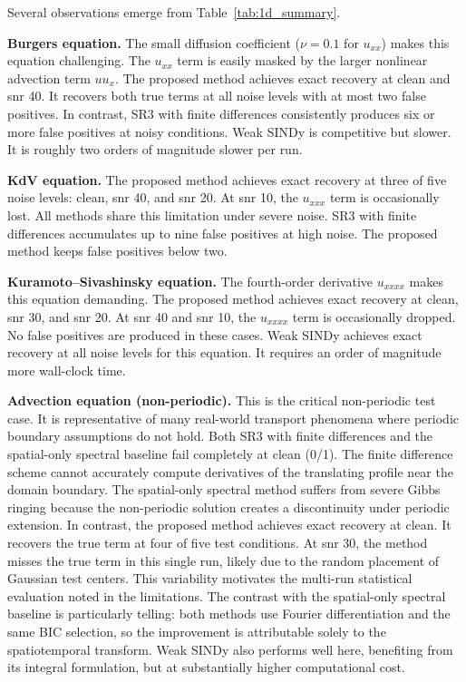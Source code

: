 \documentclass[preprint,12pt]{elsarticle}
\begin{document}
Several observations emerge from Table~\ref{tab:1d_summary}.

\textbf{Burgers equation.} The small diffusion coefficient ($\nu=0.1$ for $u_{xx}$) makes this equation challenging. The $u_{xx}$ term is easily masked by the larger nonlinear advection term $u u_x$. The proposed method achieves exact recovery at clean and snr 40. It recovers both true terms at all noise levels with at most two false positives. In contrast, SR3 with finite differences consistently produces six or more false positives at noisy conditions. Weak SINDy is competitive but slower. It is roughly two orders of magnitude slower per run.

\textbf{KdV equation.} The proposed method achieves exact recovery at three of five noise levels: clean, snr 40, and snr 20. At snr 10, the $u_{xxx}$ term is occasionally lost. All methods share this limitation under severe noise. SR3 with finite differences accumulates up to nine false positives at high noise. The proposed method keeps false positives below two.

\textbf{Kuramoto--Sivashinsky equation.} The fourth-order derivative $u_{xxxx}$ makes this equation demanding. The proposed method achieves exact recovery at clean, snr 30, and snr 20. At snr 40 and snr 10, the $u_{xxxx}$ term is occasionally dropped. No false positives are produced in these cases. Weak SINDy achieves exact recovery at all noise levels for this equation. It requires an order of magnitude more wall-clock time.

\textbf{Advection equation (non-periodic).} This is the critical non-periodic test case. It is representative of many real-world transport phenomena where periodic boundary assumptions do not hold. Both SR3 with finite differences and the spatial-only spectral baseline fail completely at clean (0/1). The finite difference scheme cannot accurately compute derivatives of the translating profile near the domain boundary. The spatial-only spectral method suffers from severe Gibbs ringing because the non-periodic solution creates a discontinuity under periodic extension. In contrast, the proposed method achieves exact recovery at clean. It recovers the true term at four of five test conditions. At snr 30, the method misses the true term in this single run, likely due to the random placement of Gaussian test centers. This variability motivates the multi-run statistical evaluation noted in the limitations. The contrast with the spatial-only spectral baseline is particularly telling: both methods use Fourier differentiation and the same BIC selection, so the improvement is attributable solely to the spatiotemporal transform. Weak SINDy also performs well here, benefiting from its integral formulation, but at substantially higher computational cost.
\end{document}
